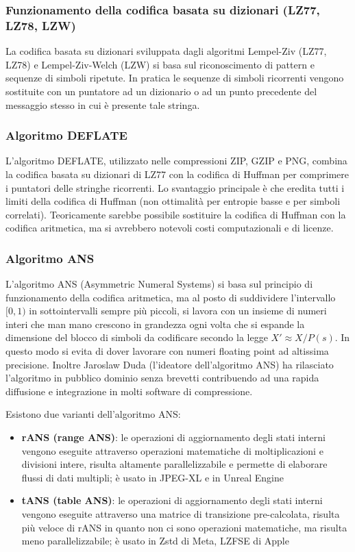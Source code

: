 \subsubsection*{Funzionamento della codifica basata su dizionari (LZ77, LZ78, LZW)}
La codifica basata su dizionari sviluppata dagli algoritmi Lempel-Ziv (LZ77, LZ78) e Lempel-Ziv-Welch (LZW) si basa sul
riconoscimento di pattern e sequenze di simboli ripetute. In pratica le sequenze di simboli ricorrenti vengono sostituite
con un puntatore ad un dizionario o ad un punto precedente del messaggio stesso in cui è presente tale stringa.

\subsubsection*{Algoritmo DEFLATE}
L'algoritmo DEFLATE, utilizzato nelle compressioni ZIP, GZIP e PNG, combina la codifica basata su dizionari di LZ77 con
la codifica di Huffman per comprimere i puntatori delle stringhe ricorrenti. Lo svantaggio principale è che eredita tutti
i limiti della codifica di Huffman (non ottimalità per entropie basse e per simboli correlati).
Teoricamente sarebbe possibile sostituire la codifica di Huffman con la codifica aritmetica, ma si avrebbero notevoli
costi computazionali e di licenze.

\subsubsection*{Algoritmo ANS}
L'algoritmo ANS (Asymmetric Numeral Systems) si basa sul principio di funzionamento della codifica aritmetica, ma al posto
di suddividere l'intervallo \([0,1)\) in sottointervalli sempre più piccoli, si lavora con un insieme di numeri interi che
man mano crescono in grandezza ogni volta che si espande la dimensione del blocco di simboli da codificare secondo la
legge \(X' \approx X / P(s)\). In questo modo si evita di dover lavorare con numeri floating point ad altissima precisione.
Inoltre Jaroslaw Duda (l'ideatore dell'algoritmo ANS) ha rilasciato l'algoritmo in pubblico dominio senza brevetti contribuendo
ad una rapida diffusione e integrazione in molti software di compressione.

Esistono due varianti dell'algoritmo ANS:
\begin{itemize}
	\item \textbf{rANS (range ANS)}: le operazioni di aggiornamento degli stati interni vengono eseguite attraverso
	operazioni matematiche di moltiplicazioni e divisioni intere, risulta altamente parallelizzabile e permette di
	elaborare flussi di dati multipli; è usato in JPEG-XL e in Unreal Engine
	\item \textbf{tANS (table ANS)}: le operazioni di aggiornamento degli stati interni vengono eseguite attraverso
	una matrice di transizione pre-calcolata, risulta più veloce di rANS in quanto non ci sono operazioni matematiche,
	ma risulta meno parallelizzabile; è usato in Zstd di Meta, LZFSE di Apple
\end{itemize}

